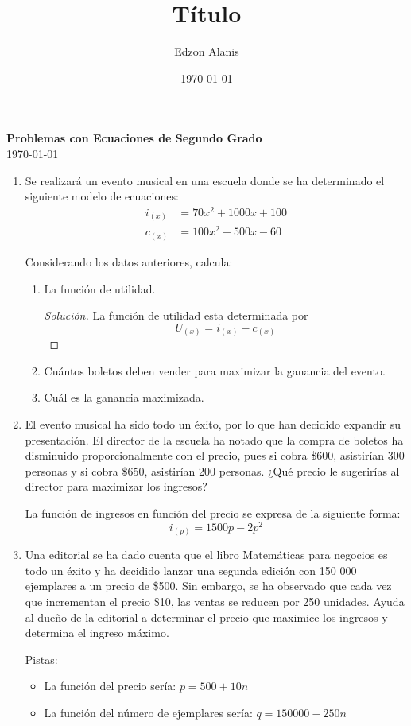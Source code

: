 \documentclass[12pt]{article}
\title{Título}
\author{Edzon Alanis}
\date{\today}
\newenvironment{solution}{\begin{proof}[Solución]}{\end{proof}}
\begin{document}

\begin{center}
    \textbf{\large Problemas con Ecuaciones de Segundo Grado} \\[0.4cm]
    \today
\end{center}

\vspace*{5mm}

\begin{enumerate}
    \item Se realizará un evento musical en una escuela donde se ha determinado el
    siguiente modelo de ecuaciones: \begin{align*}
        i_{(x)} &= 70x^2+1000x+100 \\
        c_{(x)} &= 100x^2-500x-60
    \end{align*}

    Considerando los datos anteriores, calcula: \begin{enumerate}
        \item La función de utilidad. \begin{solution}
            La función de utilidad esta determinada por \[U_{(x)} = i_{(x)}- c_{(x)}\]
        \end{solution}
        \item Cuántos boletos deben vender para maximizar la ganancia del evento.
        \item Cuál es la ganancia maximizada.
    \end{enumerate}

    \item El evento musical ha sido todo un éxito, por lo que han decidido expandir su
    presentación. El director de la escuela ha notado que la compra de boletos ha
    disminuido proporcionalmente con el precio, pues si cobra \$600, asistirían 300
    personas y si cobra \$650, asistirían 200 personas. ¿Qué precio le sugerirías al
    director para maximizar los ingresos?

    La función de ingresos en función del precio se expresa de la siguiente forma:
    \[i_{(p)} = 1500p-2p^2\]

    \item Una editorial se ha dado cuenta que el libro Matemáticas para negocios es todo un
    éxito y ha decidido lanzar una segunda edición con 150 000 ejemplares a un
    precio de \$500. Sin embargo, se ha observado que cada vez que incrementan el
    precio \$10, las ventas se reducen por 250 unidades. Ayuda al dueño de la editorial
    a determinar el precio que maximice los ingresos y determina el ingreso máximo.

    Pistas: \begin{itemize}
        \item La función del precio sería: $p = 500+10n$
        \item La función del número de ejemplares sería: $q = 150000-250n$
    \end{itemize}
\end{enumerate}


\end{document}
